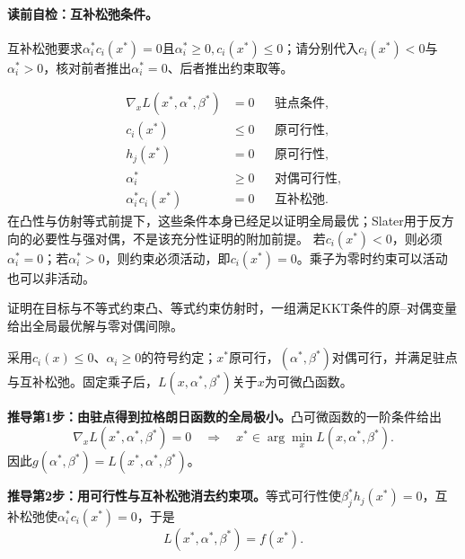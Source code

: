 \paragraph{读前自检：互补松弛条件。}互补松弛要求$\alpha_i^*c_i(x^*)=0$且$\alpha_i^*\ge0,c_i(x^*)\le0$；请分别代入$c_i(x^*)<0$与$\alpha_i^*>0$，核对前者推出$\alpha_i^*=0$、后者推出约束取等。\par

\begin{align*}
\nabla_xL(x^*,\alpha^*,\beta^*)&=0 &&\text{驻点条件},\\
c_i(x^*)&\le0 &&\text{原可行性},\\
h_j(x^*)&=0 &&\text{原可行性},\\
\alpha_i^*&\ge0 &&\text{对偶可行性},\\
\alpha_i^*c_i(x^*)&=0 &&\text{互补松弛}.
\end{align*}
在凸性与仿射等式前提下，这些条件本身已经足以证明全局最优；Slater用于反方向的必要性与强对偶，不是该充分性证明的附加前提。
若$c_i(x^*)<0$，则必须$\alpha_i^*=0$；若$\alpha_i^*>0$，则约束必须活动，即$c_i(x^*)=0$。乘子为零时约束可以活动也可以非活动。


\begin{derivationgoalbox}
证明在目标与不等式约束凸、等式约束仿射时，一组满足KKT条件的原--对偶变量给出全局最优解与零对偶间隙。
\end{derivationgoalbox}
\begin{derivationprepbox}
采用$c_i(x)\le0$、$\alpha_i\ge0$的符号约定；$x^*$原可行，$(\alpha^*,\beta^*)$对偶可行，并满足驻点与互补松弛。固定乘子后，$L(x,\alpha^*,\beta^*)$关于$x$为可微凸函数。
\end{derivationprepbox}
\textbf{推导第1步：由驻点得到拉格朗日函数的全局极小。}凸可微函数的一阶条件给出
\[
\nabla_xL(x^*,\alpha^*,\beta^*)=0
\quad\Longrightarrow\quad
x^*\in\arg\min_xL(x,\alpha^*,\beta^*).
\]
因此$g(\alpha^*,\beta^*)=L(x^*,\alpha^*,\beta^*)$。

\textbf{推导第2步：用可行性与互补松弛消去约束项。}等式可行性使$\beta_j^*h_j(x^*)=0$，互补松弛使$\alpha_i^*c_i(x^*)=0$，于是
\[
L(x^*,\alpha^*,\beta^*)=f(x^*).
\]

